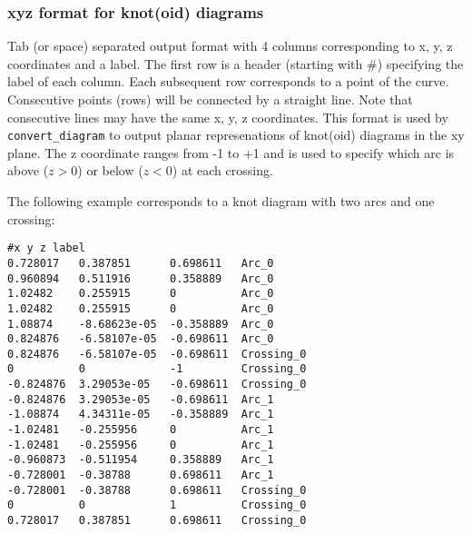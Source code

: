 \subsubsection{\label{sec:format:xyzdiagrams}xyz format for knot(oid) diagrams} 
Tab (or space) separated output format with 4 columns corresponding to x, y, z coordinates and a label.
The first row is a header (starting with \#) specifying the label of each column.
Each subsequent row corresponds to a point of the curve. Consecutive points (rows) will be connected by a straight line. Note that consecutive lines may have the same x, y, z coordinates.
This format is used by \lstinline{convert_diagram} to output planar represenations of knot(oid) diagrams in the xy plane. The z coordinate ranges from -1 to +1 and is used to specify which arc is above ($z>0$) or below ($z<0$) at each crossing.

The following example corresponds to a knot diagram with two arcs and one crossing:
\begin{lstlisting}
#x y z label
0.728017   0.387851      0.698611   Arc_0
0.960894   0.511916      0.358889   Arc_0
1.02482    0.255915      0          Arc_0
1.02482    0.255915      0          Arc_0
1.08874    -8.68623e-05  -0.358889  Arc_0
0.824876   -6.58107e-05  -0.698611  Arc_0
0.824876   -6.58107e-05  -0.698611  Crossing_0
0          0             -1         Crossing_0
-0.824876  3.29053e-05   -0.698611  Crossing_0
-0.824876  3.29053e-05   -0.698611  Arc_1
-1.08874   4.34311e-05   -0.358889  Arc_1
-1.02481   -0.255956     0          Arc_1
-1.02481   -0.255956     0          Arc_1
-0.960873  -0.511954     0.358889   Arc_1
-0.728001  -0.38788      0.698611   Arc_1
-0.728001  -0.38788      0.698611   Crossing_0
0          0             1          Crossing_0
0.728017   0.387851      0.698611   Crossing_0
\end{lstlisting}

\clearpage
